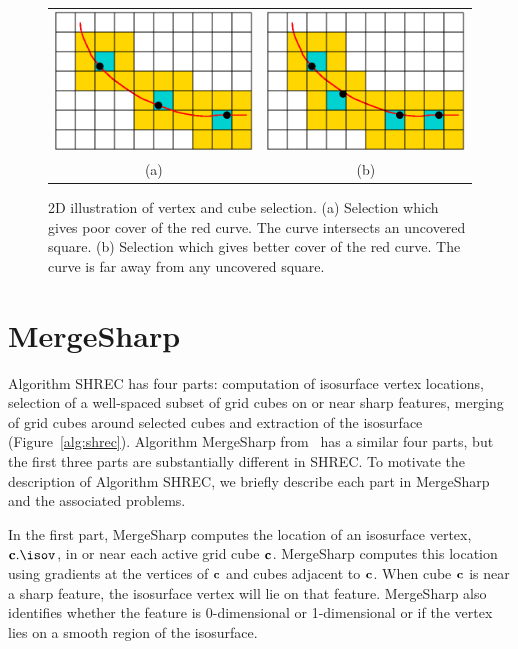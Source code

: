 \begin{figure}[t]
\centering

\begin{tabular}{cc}
\includegraphics[width=0.4\linewidth]{images/selectA.eps} \qquad &
\qquad
\includegraphics[width=0.4\linewidth]{images/selectB.eps} \\
(a) & (b) 
\end{tabular}

\caption{2D illustration of vertex and cube selection.
(a) Selection which gives poor cover of the red curve.
The curve intersects an uncovered square.
(b) Selection which gives better cover of the red curve.
The curve is far away from any uncovered square.
}
\label{fig:select}
\end{figure}


\section{MergeSharp}
\label{section:mergesharp}

Algorithm SHREC has four parts:
computation of isosurface vertex locations, 
selection of a well-spaced subset of grid cubes on or near sharp features,
merging of grid cubes around selected cubes
and extraction of the isosurface
(Figure~\ref{alg:shrec}).
Algorithm MergeSharp from~\cite{bw-cisec-13} 
has a similar four parts,
but the first three parts are substantially different in SHREC.
To motivate the description of Algorithm SHREC,
we briefly describe each part in MergeSharp and the associated problems.

In the first part, 
MergeSharp computes the location of an isosurface vertex, $\cb.\isov$,
in or near each active grid cube $\mathbf{c}$.
MergeSharp computes this location using gradients at the vertices of $\mathbf{c}$
and cubes adjacent to $\mathbf{c}$.
When cube $\mathbf{c}$ is near a sharp feature,
the isosurface vertex will lie on that feature.
MergeSharp also identifies whether the feature 
is 0-dimensional or 1-dimensional
or if the vertex lies on a smooth region of the isosurface.

